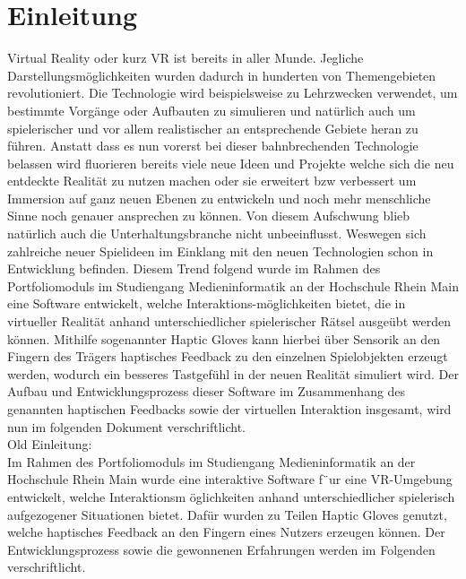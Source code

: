 \chapter{Einleitung}
Virtual Reality oder kurz \dq VR \dq ist bereits in aller Munde. Jegliche Darstellungsmöglichkeiten wurden dadurch in hunderten von Themengebieten revolutioniert. Die Technologie wird beispielsweise zu Lehrzwecken verwendet, um bestimmte Vorgänge oder Aufbauten zu simulieren und natürlich auch um spielerischer und vor allem realistischer an entsprechende Gebiete heran zu führen. Anstatt dass es nun vorerst bei dieser bahnbrechenden Technologie belassen wird fluorieren bereits  viele neue Ideen und Projekte welche sich die neu entdeckte Realität zu nutzen machen oder sie erweitert bzw verbessert um Immersion auf ganz neuen  Ebenen zu entwickeln und noch mehr menschliche Sinne noch genauer ansprechen zu können. Von diesem Aufschwung blieb natürlich auch die Unterhaltungsbranche nicht unbeeinflusst. Weswegen sich zahlreiche neuer Spielideen im Einklang mit den neuen Technologien schon in Entwicklung befinden. Diesem Trend folgend wurde im Rahmen des Portfoliomoduls im Studiengang Medieninformatik an der Hochschule Rhein Main eine Software entwickelt, welche Interaktions-möglichkeiten bietet, die in virtueller Realität anhand unterschiedlicher spielerischer Rätsel ausgeübt werden können. Mithilfe sogenannter \dq Haptic Gloves \dq kann hierbei über Sensorik an den Fingern des Trägers haptisches Feedback zu den einzelnen Spielobjekten erzeugt werden, wodurch ein besseres Tastgefühl in der neuen Realität simuliert wird. Der Aufbau und Entwicklungsprozess dieser Software im Zusammenhang des genannten haptischen Feedbacks sowie der virtuellen Interaktion insgesamt, wird nun im folgenden Dokument verschriftlicht.\\

Old Einleitung:\\
Im Rahmen des Portfoliomoduls im Studiengang Medieninformatik an der Hochschule Rhein
Main wurde eine interaktive Software f¨ur eine VR-Umgebung entwickelt, welche Interaktionsm
öglichkeiten anhand unterschiedlicher spielerisch aufgezogener Situationen bietet. Dafür wurden
zu Teilen \dq Haptic Gloves \dq genutzt, welche haptisches Feedback an den Fingern eines Nutzers
erzeugen können. Der Entwicklungsprozess sowie die gewonnenen Erfahrungen werden im
Folgenden verschriftlicht.